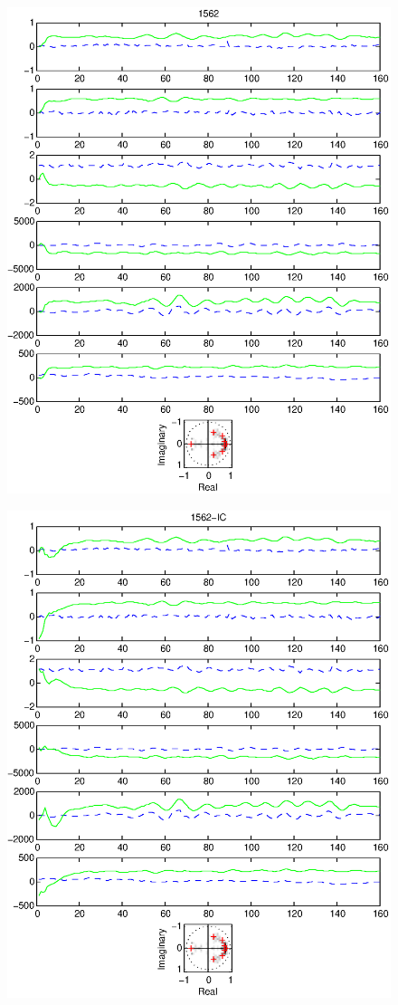 \documentclass{article}
\begin{document}
\begin{figure}[htb!]
\centering
\includegraphics{1562.eps}
\end{figure}\clearpage
\begin{figure}[htb!]
\centering
\includegraphics{1562_ic.eps}
\end{figure}\clearpage
\end{document}
